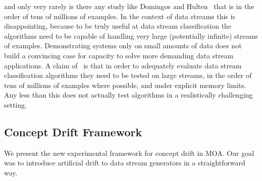 and only very rarely is there any study like Domingos and 
Hulten~\cite{Domingos,hulten-mining}  that is in the order of tens of millions 
of examples. In the context of data streams this is disappointing, because to be
truly useful at data stream classification the algorithms need to be capable of 
handling very large (potentially infinite) streams of examples. Demonstrating 
systems only on small amounts of data does not build a convincing case for capacity
to solve more demanding data stream applications.
\ENDOMIT
\BEGINOMIT
    A claim of~\cite{Kirkby-PhD} is that in order to adequately evaluate data stream
classification algorithms they need to be tested on large streams, in the order
of tens of millions of examples where possible, and under explicit memory
limits. Any less than this does not actually test algorithms in a realistically
challenging setting. 
\ENDOMIT

\subsection{Concept Drift Framework}
We present the new experimental framework for concept drift in MOA. Our goal was to introduce
artificial drift to data stream generators in a straightforward way. 
 
